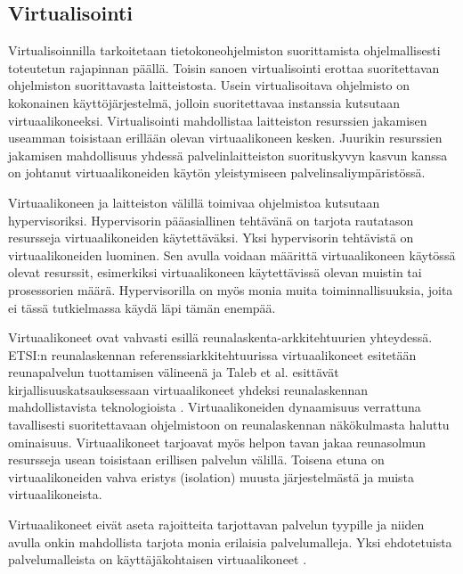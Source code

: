 \subsection{Virtualisointi}

Virtualisoinnilla tarkoitetaan tietokoneohjelmiston suorittamista ohjelmallisesti toteutetun rajapinnan päällä. 
Toisin sanoen virtualisointi erottaa suoritettavan ohjelmiston suorittavasta laitteistosta.
Usein virtualisoitava ohjelmisto on kokonainen käyttöjärjestelmä, jolloin suoritettavaa instanssia kutsutaan virtuaalikoneeksi. 
Virtualisointi mahdollistaa laitteiston resurssien jakamisen useamman toisistaan erillään olevan virtuaalikoneen kesken.
Juurikin resurssien jakamisen mahdollisuus yhdessä palvelinlaitteiston suorituskyvyn kasvun kanssa on johtanut virtuaalikoneiden käytön yleistymiseen palvelinsaliympäristössä.

Virtuaalikoneen ja laitteiston välillä toimivaa ohjelmistoa kutsutaan hypervisoriksi. Hypervisorin pääasiallinen tehtävänä on tarjota rautatason resursseja virtuaalikoneiden käytettäväksi. 
Yksi hypervisorin tehtävistä on virtuaalikoneiden luominen. Sen avulla voidaan määrittä virtuaalikoneen käytössä olevat resurssit, esimerkiksi virtuaalikoneen käytettävissä olevan muistin tai prosessorien määrä. Hypervisorilla on myös monia muita toiminnallisuuksia, joita ei tässä tutkielmassa käydä läpi tämän enempää. 

Virtuaalikoneet ovat vahvasti esillä reunalaskenta-arkkitehtuurien yhteydessä. 
ETSI:n reunalaskennan referenssiarkkitehtuurissa \cite{etsirefarch} virtuaalikoneet esitetään reunapalvelun tuottamisen välineenä ja Taleb et al. esittävät kirjallisuuskatsauksessaan virtuaalikoneet yhdeksi reunalaskennan mahdollistavista teknologioista  \cite{taleb2017multi}.
Virtuaalikoneiden dynaamisuus verrattuna tavallisesti suoritettavaan ohjelmistoon on reunalaskennan näkökulmasta haluttu ominaisuus. 
Virtuaalikoneet tarjoavat myös helpon tavan jakaa reunasolmun resursseja usean toisistaan erillisen palvelun välillä.
Toisena etuna on virtuaalikoneiden vahva eristys (isolation) muusta järjestelmästä ja muista virtuaalikoneista.

Virtuaalikoneet eivät aseta rajoitteita tarjottavan palvelun tyypille ja niiden avulla onkin mahdollista tarjota monia erilaisia palvelumalleja.
Yksi ehdotetuista palvelumalleista on käyttäjäkohtaisen virtuaalikoneet \cite{satya09,wang2015mobiscud}. 

